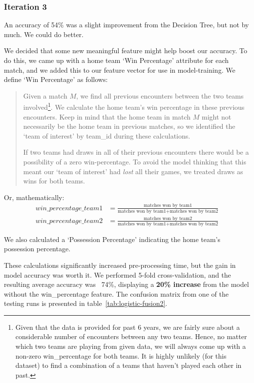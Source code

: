 \documentclass[11pt]{article}
\begin{document}
\subsubsection{Iteration 3}
An accuracy of 54\% was a slight improvement from the Decision Tree, but not by much.
We could do better.

We decided that some new meaningful feature might help boost our accuracy.
To do this, we came up with a home team `Win Percentage' attribute for each match, and we added this to our feature vector for use in model-training.
We define `Win Percentage' as follows:
\begin{quotation}
  Given a match $M$, we find all previous encounters between the two teams involved\footnote{Given that the data is provided for past 6 years, we are fairly sure about a considerable number of encounters between any two teams. Hence, no matter which two teams are playing from given data, we will always come up with a non-zero win\_percentage for both teams. It is highly unlikely (for this dataset) to find a combination of a teams that haven't played each other in past.}.
  We calculate the home team's win percentage in these previous encounters.
  Keep in mind that the home team in match $M$ might not necessarily be the home team in previous matches, so we identified the `team of interest' by team\_id during these calculations.

  If two teams had draws in all of their previous encounters there would be a possibility of a zero win-percentage.
  To avoid the model thinking that this meant our `team of interest' had \textit{lost} all their games, we treated draws as wins for both teams.
\end{quotation}

Or, mathematically:
\begin{align*}
win\_percentage\_team1 &= \frac{\textrm{matches won by team1}}{\textrm{matches won by team1} + \textrm{matches won by team2}} \\
win\_percentage\_team2 &= \frac{\textrm{matches won by team2}}{\textrm{matches won by team1} + \textrm{matches won by team2}}
\end{align*}

We also calculated a `Possession Percentage' indicating the home team's possession percentage.

These calculations significantly increased pre-processing time, but the gain in model accuracy was worth it.
We performed 5-fold cross-validation, and the resulting average accuracy was ~74\%, displaying a \textbf{20\% increase} from the model without the win\_percentage feature.
The confusion matrix from one of the testing runs is presented in table~\ref{tab:logistic-fusion2}.
\end{document}
